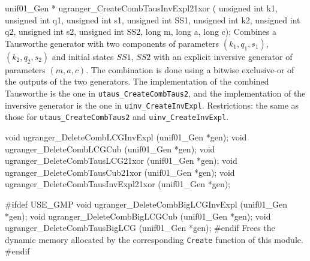 unif01_Gen * ugranger_CreateCombTausInvExpl21xor (
   unsigned int k1, unsigned int q1, unsigned int s1, unsigned int SS1,
   unsigned int k2, unsigned int q2, unsigned int s2, unsigned int SS2,
   long m, long a, long c);
\endcode
 \tab Combines a Tausworthe generator  with two components of parameters 
  $(k_1, q_1, s_1)$, $(k_2, q_2, s_2)$ and
  initial states $\mathit{SS1}$, $\mathit{SS2}$ with an 
  explicit  inversive  generator
  of parameters  $(m, a, c)$.  The combination is done  using a
  bitwise exclusive-or of the outputs of the two generators.
  The implementation of the  
  combined  Tausworthe is the one in {\tt utaus\_CreateCombTaus2},
  and the implementation of the inversive generator
  is the one in {\tt uinv\_CreateInvExpl}.
  Restrictions: the same as those for {\tt utaus\_CreateCombTaus2} and
  {\tt uinv\_CreateInvExpl}.
 \endtab


\code

void ugranger_DeleteCombLCGInvExpl (unif01_Gen *gen);
void ugranger_DeleteCombLCGCub (unif01_Gen *gen);
void ugranger_DeleteCombTausLCG21xor (unif01_Gen *gen);
void ugranger_DeleteCombTausCub21xor (unif01_Gen *gen);
void ugranger_DeleteCombTausInvExpl21xor (unif01_Gen *gen);

#ifdef USE_GMP
   void ugranger_DeleteCombBigLCGInvExpl (unif01_Gen *gen);
   void ugranger_DeleteCombBigLCGCub (unif01_Gen *gen);
   void ugranger_DeleteCombTausBigLCG (unif01_Gen *gen);
#endif
\endcode
 \tab  Frees the dynamic memory allocated by the corresponding {\tt Create}
  function of this module.
 \endtab
\code
\hide
#endif
\endhide
\endcode
